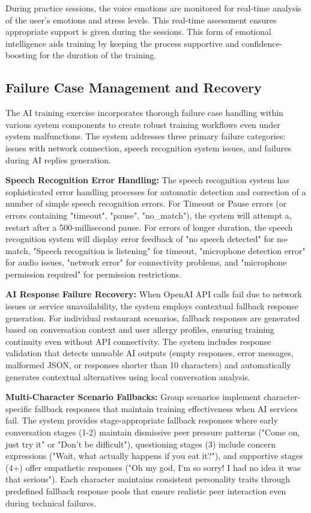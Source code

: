 \documentclass[MScCS]{uccthesis}
\begin{document}
During practice sessions, the voice emotions are monitored for real-time analysis of the user's emotions and stress levels. This real-time assessment ensures appropriate support is given during the sessions. This form of emotional intelligence aids training by keeping the process supportive and confidence-boosting for the duration of the training.


\subsection{Failure Case Management and Recovery}

The AI training exercise incorporates thorough failure case handling within various system components to create robust training workflows even under system malfunctions. The system addresses three primary failure categories: issues with network connection, speech recognition system issues, and failures during AI replies generation.

\textbf{Speech Recognition Error Handling:} The speech recognition system has sophisticated error handling processes for automatic detection and correction of a number of simple speech recognition errors. For Timeout or Pause errors (or errors containing "timeout", "pause", "no\_match"), the system will attempt a, restart after a 500-millisecond pause. For errors of longer duration, the speech recognition system will display error feedback of "no speech detected" for no-match, "Speech recognition is listening" for timeout, "microphone detection error" for audio issues, "network error" for connectivity problems, and "microphone permission required" for permission restrictions.

\textbf{AI Response Failure Recovery:} When OpenAI API calls fail due to network issues or service unavailability, the system employs contextual fallback response generation. For individual restaurant scenarios, fallback responses are generated based on conversation context and user allergy profiles, ensuring training continuity even without API connectivity. The system includes response validation that detects unusable AI outputs (empty responses, error messages, malformed JSON, or responses shorter than 10 characters) and automatically generates contextual alternatives using local conversation analysis.

\textbf{Multi-Character Scenario Fallbacks:} Group scenarios implement character-specific fallback responses that maintain training effectiveness when AI services fail. The system provides stage-appropriate fallback responses where early conversation stages (1-2) maintain dismissive peer pressure patterns ("Come on, just try it" or "Don't be difficult"), questioning stages (3) include concern expressions ("Wait, what actually happens if you eat it?"), and supportive stages (4+) offer empathetic responses ("Oh my god, I'm so sorry! I had no idea it was that serious"). Each character maintains consistent personality traits through predefined fallback response pools that ensure realistic peer interaction even during technical failures.
\end{document}
